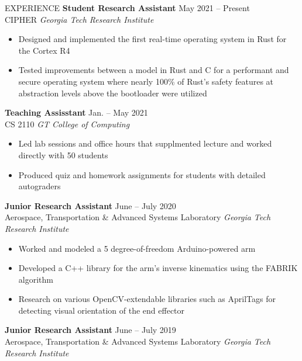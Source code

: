 \documentclass{resume} %
\begin{document}
\vspace{-1em}
\begin{rSection}{EXPERIENCE}
\textbf{Student Research Assistant} \hfill May 2021 -- Present\\
CIPHER \hfill \textit{Georgia Tech Research Institute}
\vspace{-0.5em}
 \begin{itemize}
    \itemsep -5pt {} 
     \item Designed and implemented the first real-time operating system in Rust for the Cortex R4
     \item Tested improvements between a model in Rust and C for a performant and secure operating system where
     nearly 100\% of Rust's safety features at abstraction levels above the bootloader were utilized
 \end{itemize}
\vspace{-0.5em}
\textbf{Teaching Assisstant} \hfill Jan. -- May 2021\\
CS 2110 \hfill \textit{GT College of Computing}
\vspace{-0.5em}
 \begin{itemize}
    \itemsep -5pt {}
     \item Led lab sessions and office hours that supplmented lecture and worked directly with 50 students
     \item Produced quiz and homework assignments for students with detailed autograders
 \end{itemize}
\vspace{-0.5em}
\textbf{Junior Research Assistant} \hfill June -- July 2020\\
Aerospace, Transportation \& Advanced Systems Laboratory \hfill \textit{Georgia Tech Research Institute}
\vspace{-0.5em}
 \begin{itemize}
    \itemsep -5pt {} 
     \item Worked and modeled a 5 degree-of-freedom Arduino-powered arm
     \item Developed a C++ library for the arm's inverse kinematics using the FABRIK algorithm
     \item Research on various OpenCV-extendable libraries such as AprilTags for detecting visual orientation of the end effector
 \end{itemize}
 \vspace{-0.5em}
\textbf{Junior Research Assistant} \hfill June -- July 2019\\
Aerospace, Transportation \& Advanced Systems Laboratory \hfill \textit{Georgia Tech Research Institute}

\end{rSection}
\end{document}
